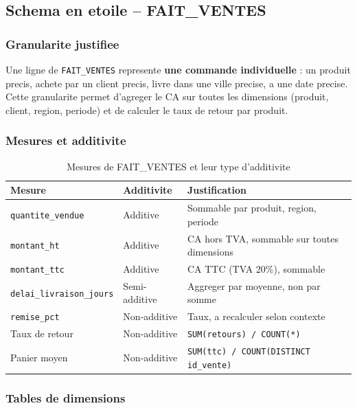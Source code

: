 \documentclass[12pt,a4paper]{article}
\begin{document}
\subsection{Schema en etoile -- FAIT\_VENTES}

\subsubsection{Granularite justifiee}

\begin{infobox}[title=Granularite choisie]
Une ligne de \texttt{FAIT\_VENTES} represente \textbf{une commande individuelle} : un produit
precis, achete par un client precis, livre dans une ville precise, a une date precise. Cette
granularite permet d'agreger le CA sur toutes les dimensions (produit, client, region, periode)
et de calculer le taux de retour par produit.
\end{infobox}

\subsubsection{Mesures et additivite}

\begin{table}[H]
\centering
\begin{tabular}{p{4.5cm} p{3.5cm} p{5.5cm}}
\toprule
\textbf{Mesure} & \textbf{Additivite} & \textbf{Justification}\\
\midrule
\texttt{quantite\_vendue} & Additive & Sommable par produit, region, periode\\
\texttt{montant\_ht} & Additive & CA hors TVA, sommable sur toutes dimensions\\
\texttt{montant\_ttc} & Additive & CA TTC (TVA 20\%), sommable\\
\texttt{delai\_livraison\_jours} & Semi-additive & Aggreger par moyenne, non par somme\\
\texttt{remise\_pct} & Non-additive & Taux, a recalculer selon contexte\\
Taux de retour & Non-additive & \texttt{SUM(retours) / COUNT(*)}\\
Panier moyen & Non-additive & \texttt{SUM(ttc) / COUNT(DISTINCT id\_vente)}\\
\bottomrule
\end{tabular}
\caption{Mesures de FAIT\_VENTES et leur type d'additivite}
\end{table}

\subsubsection{Tables de dimensions}
\end{document}
